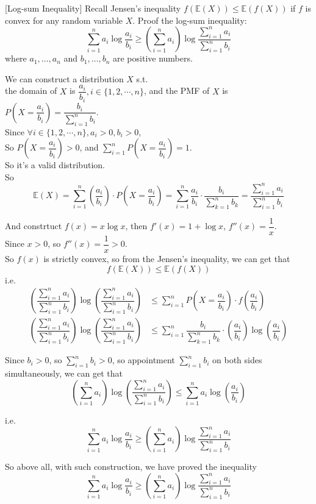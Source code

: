 \item {} [Log-sum Inequality] Recall Jensen's inequality $f(\mathbb{E}(X)) \leq \mathbb{E}(f(X))$ if $f$ is convex for any random variable $X$. Proof the log-sum inequality:
$$ \sum_{i=1}^{n} a_i \log \frac{a_i}{b_i} \geq \left( \sum_{i=1}^{n} a_i\right) \log \frac{\sum_{i=1}^{n} a_i}{\sum_{i=1}^{n} b_i} $$
where $a_1,\ldots,a_n$ and $b_1,\ldots,b_n$ are positive numbers.

\solution

We can construct a distribution $X$ s.t. \\
the domain of $X$ is $\dfrac{a_i}{b_i}, i\in\{1,2,\cdots,n\}$, and the PMF of $X$ is $P(X=\dfrac{a_i}{b_i})=\dfrac{b_i}{\sum\limits_{i=1}^{n}b_i}$.\\
Since $\forall i \in\{1,2,\cdots,n\}, a_i > 0, b_i > 0$,\\
So $P(X=\dfrac{a_i}{b_i}) > 0$, and $\sum\limits_{i=1}^{n}P(X=\dfrac{a_i}{b_i})=1$.\\
So it's a valid distribution.\\
So $$\mathbb{E}(X)=\sum\limits_{i=1}^{n} (\dfrac{a_i}{b_i})\cdot P(X=\dfrac{a_i}{b_i})=\sum\limits_{i=1}^{n} \dfrac{a_i}{b_i}\cdot \dfrac{b_i}{\sum\limits_{k=1}^{n}b_k}=\dfrac{\sum\limits_{i=1}^{n}a_i}{\sum\limits_{i=1}^{n}b_i}$$

And constrtuct $f(x)=x\log x$, then $f'(x)=1+\log x$, $f''(x)=\dfrac{1}{x}$.\\
Since $x>0$, so $f''(x)=\dfrac{1}{x}>0$.\\
So $f(x)$ is strictly convex, so from the Jensen's inequality, we can get that\\
$$f(\mathbb{E}(X)) \leq \mathbb{E}(f(X))$$
i.e.
\begin{align*}
\left(\dfrac{\sum\limits_{i=1}^{n}a_i}{\sum\limits_{i=1}^{n}b_i}\right)\log \left(\dfrac{\sum\limits_{i=1}^{n}a_i}{\sum\limits_{i=1}^{n}b_i}\right) &\leq \sum\limits_{i=1}^{n} P(X=\dfrac{a_i}{b_i})\cdot f(\dfrac{a_i}{b_i}) \\
\left(\dfrac{\sum\limits_{i=1}^{n}a_i}{\sum\limits_{i=1}^{n}b_i}\right)\log \left(\dfrac{\sum\limits_{i=1}^{n}a_i}{\sum\limits_{i=1}^{n}b_i}\right) &\leq \sum\limits_{i=1}^{n} \dfrac{b_i}{\sum\limits_{k=1}^nb_k}\cdot(\dfrac{a_i}{b_i})\log(\dfrac{a_i}{b_i})
\end{align*}

Since $b_i>0$, so $\sum\limits_{i=1}^nb_i>0$, so appointment $\sum\limits_{i=1}^nb_i$ on both sides simultaneously, we can get that
$$\left(\sum\limits_{i=1}^{n} a_i\right) \log \left(\dfrac{\sum\limits_{i=1}^{n} a_i}{\sum\limits_{i=1}^{n} b_i}\right)
\leq \sum\limits_{i=1}^{n} a_i\log \left(\dfrac{a_i}{b_i}\right)$$

i.e. $$\sum\limits_{i=1}^{n} a_i \log \frac{a_i}{b_i} \geq \left( \sum_{i=1}^{n} a_i\right) \log \frac{\sum_{i=1}^{n} a_i}{\sum_{i=1}^{n} b_i}$$

So above all, with such construction, we have proved the inequality
$$\sum_{i=1}^{n} a_i \log \frac{a_i}{b_i} \geq \left( \sum_{i=1}^{n} a_i\right) \log \frac{\sum_{i=1}^{n} a_i}{\sum_{i=1}^{n} b_i}$$

\newpage